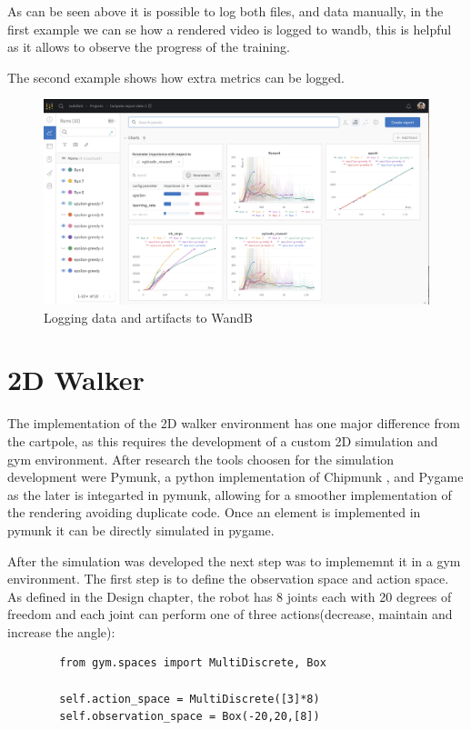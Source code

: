 As can be seen above it is possible to log both files, and data manually, in the first example we can se how a rendered video is logged to wandb, this is helpful as it allows to observe the progress of the training.

The second example shows how extra metrics can be logged.

\begin{figure}[H]
    \centering
    \includegraphics[width=1\textwidth]{figures/wandb.png}
    \caption{Logging data and artifacts to WandB}
\end{figure}

\section{2D Walker}
The implementation of the 2D walker environment has one major difference from the cartpole, as this requires the development of a custom 2D simulation and gym environment. After research the tools choosen for the simulation development were Pymunk\cite{pymunk}, a python implementation of Chipmunk\cite{chipmunk} , and Pygame\cite{pygame} as the later is integarted in pymunk, allowing for a smoother implementation of the rendering avoiding duplicate code. Once an element is implemented in pymunk it can be directly simulated in pygame.


After the simulation was developed the next step was to implememnt it in a gym environment.
The first step is to define the observation space and action space.
As defined in the Design chapter, the robot has 8 joints each with 20 degrees of freedom and each joint can perform one of three actions(decrease, maintain and increase the angle):
    \lstset{language=Python}
    \lstset{frame=lines}
    \lstset{basicstyle=\footnotesize}
    \begin{lstlisting}
        from gym.spaces import MultiDiscrete, Box

        self.action_space = MultiDiscrete([3]*8)
        self.observation_space = Box(-20,20,[8])
    \end{lstlisting}

